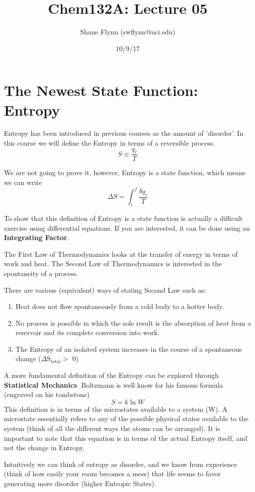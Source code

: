 \documentclass{article}
\title{Chem132A: Lecture 05}
\author{Shane Flynn (swflynn@uci.edu) }
\date{10/9/17}
\newcommand{\be}{\begin{equation}}
\newcommand{\ee}{\end{equation}}
\newcommand{\benum}{\begin{enumerate}}
\newcommand{\eenum}{\end{enumerate}}
\begin{document}
\maketitle

\section*{The Newest State Function: Entropy}
Entropy has been introduced in previous courses as the amount of 'disorder'. 
In this course we will define the Entropy in terms of a reversible process. 
\be
S \equiv \frac{q_r}{T}
\ee

We are not going to prove it, however, Entropy is a state function, which means we can write
\be
\Delta S = \int_i^f \frac{\delta q_r}{T}
\ee

To show that this definition of Entropy is a state function is actually a difficult exercise using differential equations. 
If you are interested, it can be done using an \textbf{Integrating Factor}.

The First Law of Thermodynamics looks at the transfer of energy in terms of work and heat. 
The Second Law of Thermodynamics is interested in the spontaneity of a process. 

There are various (equivalent) ways of stating Second Law such as:
\benum
\item Heat does not flow spontaneously from a cold body to a hotter body.
\item No process is possible in which the sole result is the absorption of heat from a reservoir and its complete conversion into work.
\item The Entropy of an isolated system increases in the course of a spontaneous change ($\Delta$S$_{\text{total}} >$ 0)
\eenum

A more fundamental definition of the Entropy can be explored through \textbf{Statistical Mechanics}. 
Boltzmann is well know for his famous formula (engraved on his tombstone) 
\be
S = k \ln W
\ee
This definition is in terms of the microstates available to a system (W). 
A microstate essentially refers to any of the possible physical states available to the system (think of all the different ways the atoms can be arranged).
It is important to note that this equation is in terms of the actual Entropy itself, and not the change in Entropy.

Intuitively we can think of entropy as disorder, and we know from experience (think of how easily your room becomes a mess) that life seems to favor generating more disorder (higher Entropic States).
\end{document}

